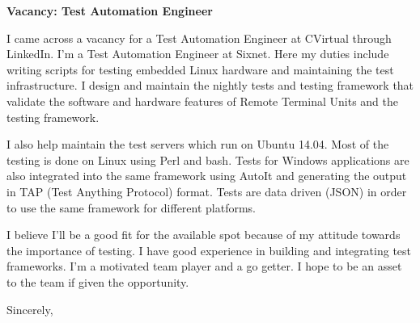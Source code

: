 \documentclass[12pt]{extletter}
\newcommand{\jobPosition}{Test Automation Engineer}
\newcommand{\companyName}{CVirtual}
\begin{document}
\begin{letter}{}

\opening{\textbf{Vacancy: {\jobPosition}}}
 
I came across a vacancy for a {\jobPosition} at {\companyName} through
LinkedIn. I'm a Test Automation Engineer at Sixnet. Here my duties include
writing scripts for testing embedded Linux hardware and maintaining the test
infrastructure. I design and maintain the nightly tests and testing framework
that validate the software and hardware features of Remote Terminal Units and
the testing framework.

I also help maintain the test servers which run on Ubuntu 14.04. Most of the
testing is done on Linux using Perl and bash. Tests for Windows applications
are also integrated into the same framework using AutoIt and generating the
output in TAP (Test Anything Protocol) format. Tests are data driven (JSON)
in order to use the same framework for different platforms.

I believe I'll be a good fit for the available spot because of my attitude
towards the importance of testing. I have good experience in building and
integrating test frameworks. I'm a motivated team player and a go getter. I
hope to be an asset to the team if given the opportunity.

\vspace{2\parskip} %
\closing{Sincerely,}
\vspace{2\parskip} %

\end{letter}
 
\end{document}
